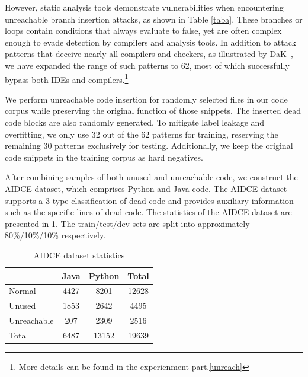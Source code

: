 \documentclass[11pt]{article}
\begin{document}
However, static analysis tools demonstrate vulnerabilities when encountering unreachable branch insertion attacks, as shown in Table \ref{taba}. These branches or loops contain conditions that always evaluate to false, yet are often complex enough to evade detection by compilers and analysis tools. In addition to attack patterns that deceive nearly all compilers and checkers, as illustrated by DaK~\cite{gao2023discrete}, we have expanded the range of such patterns to 62, most of which successfully bypass both IDEs and compilers.\footnote{More details can be found in the experienment part.\ref{unreach}}

We perform unreachable code insertion for randomly selected files in our code corpus while preserving the original function of those snippets. The inserted dead code blocks are also randomly generated. To mitigate label leakage and overfitting, we only use 32 out of the 62 patterns for training, reserving the remaining 30 patterns exclusively for testing. Additionally, we keep the original code snippets in the training corpus as hard negatives.


After combining samples of both unused and unreachable code, we construct the AIDCE dataset, which comprises Python and Java code. The AIDCE dataset supports a 3-type classification of dead code and provides auxiliary information such as the specific lines of dead code. The statistics of the AIDCE dataset are presented in \ref{tab:aidce_stats}. The train/test/dev sets are split into approximately 80\%/10\%/10\% respectively.

\begin{table}[h]
\centering
\caption{AIDCE dataset statistics}
\small
\begin{tabular}{lccc}
\toprule
 & Java & Python & \cellcolor{gray!20}Total \\
\midrule
Normal & 4427 & 8201 & \cellcolor{gray!20}12628 \\
Unused & 1853 & 2642 & \cellcolor{gray!20}4495 \\
Unreachable & 207 & 2309 & \cellcolor{gray!20}2516 \\
\cellcolor{gray!20}Total & \cellcolor{gray!20}6487 & \cellcolor{gray!20}13152 & \cellcolor{gray!20}19639 \\
\bottomrule
\end{tabular}
\label{tab:aidce_stats}
\end{table}
\end{document}
